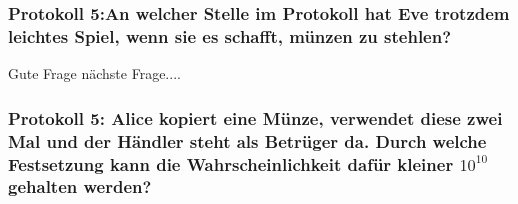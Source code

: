 \subsubsection{Protokoll 5:An welcher Stelle im Protokoll hat Eve trotzdem leichtes Spiel, wenn sie es schafft, münzen zu stehlen?}

Gute Frage nächste Frage....

\subsubsection{Protokoll 5: Alice kopiert eine Münze, verwendet diese zwei Mal und der Händler steht als Betrüger da. Durch welche Festsetzung kann die Wahrscheinlichkeit dafür kleiner $10^{10}$ gehalten werden?}

